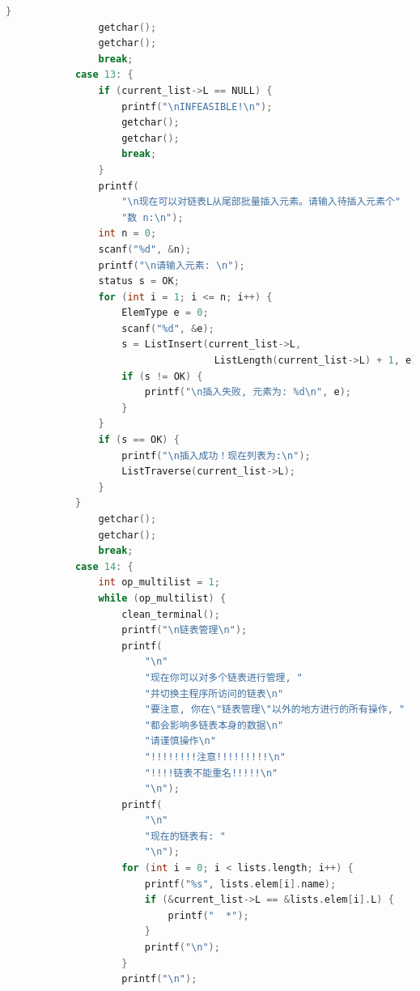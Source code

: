 \documentclass[supercite]{Experimental_Report}
\theoremstyle{definition}
\begin{document}
\begin{lstlisting}[caption={$main.cpp$}, language=C++, frame=single]
			}
				getchar();
				getchar();
				break;
			case 13: {
				if (current_list->L == NULL) {
					printf("\nINFEASIBLE!\n");
					getchar();
					getchar();
					break;
				}
				printf(
					"\n现在可以对链表L从尾部批量插入元素。请输入待插入元素个"
					"数 n:\n");
				int n = 0;
				scanf("%d", &n);
				printf("\n请输入元素: \n");
				status s = OK;
				for (int i = 1; i <= n; i++) {
					ElemType e = 0;
					scanf("%d", &e);
					s = ListInsert(current_list->L,
									ListLength(current_list->L) + 1, e);
					if (s != OK) {
						printf("\n插入失败, 元素为: %d\n", e);
					}
				}
				if (s == OK) {
					printf("\n插入成功！现在列表为:\n");
					ListTraverse(current_list->L);
				}
			}
				getchar();
				getchar();
				break;
			case 14: {
				int op_multilist = 1;
				while (op_multilist) {
					clean_terminal();
					printf("\n链表管理\n");
					printf(
						"\n"
						"现在你可以对多个链表进行管理, "
						"并切换主程序所访问的链表\n"
						"要注意, 你在\"链表管理\"以外的地方进行的所有操作, "
						"都会影响多链表本身的数据\n"
						"请谨慎操作\n"
						"!!!!!!!!注意!!!!!!!!!\n"
						"!!!!链表不能重名!!!!!\n"
						"\n");
					printf(
						"\n"
						"现在的链表有: "
						"\n");
					for (int i = 0; i < lists.length; i++) {
						printf("%s", lists.elem[i].name);
						if (&current_list->L == &lists.elem[i].L) {
							printf("  *");
						}
						printf("\n");
					}
					printf("\n");


\end{lstlisting}
\end{document}
